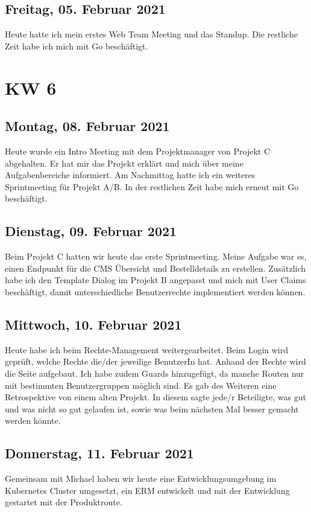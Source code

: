 \section{Freitag, 05. Februar 2021}
Heute hatte ich mein erstes Web Team Meeting und das Standup. Die restliche Zeit habe ich mich mit Go beschäftigt.


\chapter{KW 6}

\section{Montag, 08. Februar 2021}
Heute wurde ein Intro Meeting mit dem Projektmanager von Projekt C abgehalten. Er hat mir das Projekt erklärt und mich über meine Aufgabenbereiche informiert. Am Nachmittag hatte ich ein weiteres Sprintmeeting für Projekt A/B. In der restlichen Zeit habe mich erneut mit Go beschäftigt.

\section{Dienstag, 09. Februar 2021}
Beim Projekt C hatten wir heute das erste Sprintmeeting. Meine Aufgabe war es, einen Endpunkt für die CMS Übersicht und Bestelldetails zu erstellen. Zusätzlich habe ich den Template Dialog im Projekt B angepasst und mich mit User Claims beschäftigt, damit unterschiedliche Benutzerrechte implementiert werden können.

\section{Mittwoch, 10. Februar 2021}
Heute habe ich beim Rechte-Management weitergearbeitet. Beim Login wird geprüft, welche Rechte die/der jeweilige BenutzerIn hat. Anhand der Rechte wird die Seite aufgebaut. Ich habe zudem Guards hinzugefügt, da manche Routen nur mit bestimmten Benutzergruppen möglich sind. Es gab des Weiteren eine Retrospektive von einem alten Projekt. In diesem sagte jede/r Beteiligte, was gut und was nicht so gut gelaufen ist, sowie was beim nächsten Mal besser gemacht werden könnte.

\section{Donnerstag, 11. Februar 2021}
Gemeinsam mit Michael haben wir heute eine Entwicklungsumgebung im Kubernetes Cluster umgesetzt, ein ERM entwickelt und mit der Entwicklung gestartet mit der Produktroute.

